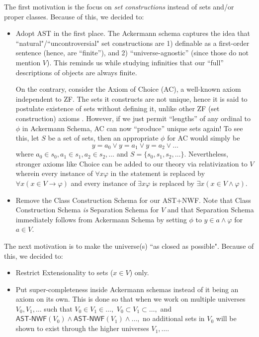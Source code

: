 \documentclass{article}
\begin{document}
The first motivation is the focus on \textit{set constructions} instead of sets and/or proper classes. Because of this, we decided to:
\begin{itemize}
\item Adopt AST in the first place. The Ackermann schema captures the idea that ``natural"/``uncontroversial" set constructions are 1) definable as a first-order sentence (hence, are ``finite''), and 2) ``universe-agnostic'' (since those do not mention $V$). This reminds us while studying infinities that our ``full'' descriptions of objects are always finite.

On the contrary, consider the Axiom of Choice (AC), a well-known axiom independent to ZF. The sets it constructs are not unique, hence it is said to postulate existence of sets without defining it, unlike other ZF (set construction) axioms \cite[Chapter 5]{jech}. However, if we just permit ``lengths'' of any ordinal to $\phi$ in Ackermann Schema, AC can now ``produce'' unique sets again! To see this, let $S$ be a set of sets, then an appropriate $\phi$ for AC would simply be $$y = a_0 \vee y = a_1 \vee y = a_2 \vee \ldots$$ where $a_0 \in s_0, a_1 \in s_1, a_2 \in s_2, \ldots$ and $S=\{s_0, s_1, s_2, \ldots\}$. Nevertheless, stronger axioms like Choice can be added to our theory via relativization to $V$ wherein every instance of $\forall x \varphi$ in the statement is replaced by $\forall x (x \in V \rightarrow \varphi)$ and every instance of $\exists x \varphi$ is replaced by $\exists x (x \in V \wedge \varphi)$.
\item Remove the Class Construction Schema for our \textsf{AST+NWF}. Note that Class Construction Schema \textit{is} Separation Schema for $V$ and that Separation Schema immediately follows from Ackermann Schema by setting $\phi$ to $y \in a \wedge \varphi$ for $a\in V$.
\end{itemize}

The next motivation is to make the universe(s) ``as closed as possible". Because of this, we decided to:
\begin{itemize}
\item Restrict Extensionality to sets ($x \in V$) only.
\item Put super-completeness inside Ackermann schemas instead of it being an axiom on its own. This is done so that when we work on multiple universes $V_0, V_1, \ldots$ such that $V_0 \in V_1 \in \ldots,$ $V_0 \subset V_1 \subset \ldots,$ and $\textsf{AST-NWF}(V_0) \wedge \textsf{AST-NWF}(V_1) \wedge\ldots,$ no additional sets in $V_0$ will be shown to exist through the higher universes $V_1, \ldots.$
\end{itemize}
\end{document}
